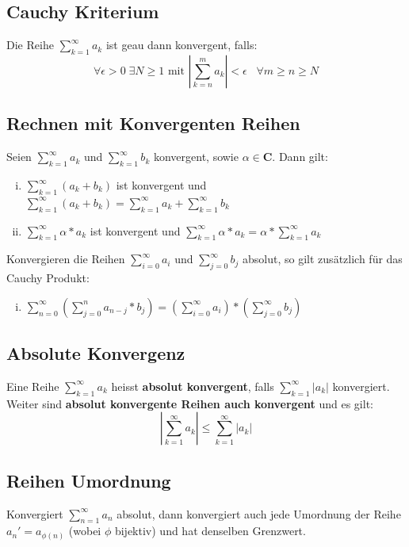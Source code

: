 \documentclass[8pt]{article}
\begin{document}
\begin{multicols*}{3}
\subsection{Cauchy Kriterium}
Die Reihe $\sum_{k = 1}^{\infty} a_k$ ist geau dann konvergent, falls:
$$
  \forall \epsilon > 0 \; \exists N \geq 1 \text{ mit } \left| \sum_{k = n}^m a_k \right| < \epsilon \; \; \; \forall m \geq n \geq N
$$
\subsection{Rechnen mit Konvergenten Reihen}
Seien $\sum_{k = 1}^\infty a_k$ und $\sum_{k = 1}^\infty b_k$ konvergent, sowie $\alpha \in \mathbf{C}$.
Dann gilt:
\begin{enumerate}[(i)]
  \item $\sum_{k = 1}^\infty (a_k + b_k)$ ist konvergent und $\sum_{k = 1}^\infty (a_k + b_k) = \sum_{k = 1}^\infty a_k + \sum_{k = 1}^\infty b_k$
  \item $\sum_{k = 1}^\infty \alpha * a_k$ ist konvergent und $\sum_{k = 1}^\infty \alpha * a_k = \alpha * \sum_{k = 1}^\infty a_k$
\end{enumerate}
Konvergieren die Reihen $\sum_{i = 0}^\infty a_i$ und $\sum_{j = 0}^\infty b_j$ absolut,
so gilt zusätzlich für das Cauchy Produkt:
\begin{enumerate}[(iii)]
  \item $\sum_{n = 0}^\infty (\sum_{j = 0}^n a_{n - j} * b_j) = (\sum_{i = 0}^\infty a_i) * (\sum_{j = 0}^\infty b_j)$
\end{enumerate}
\subsection {Absolute Konvergenz}
Eine Reihe $\sum_{k = 1}^{\infty} a_k$ heisst \textbf{absolut konvergent},
falls $\sum_{k = 1}^{\infty} |a_k|$ konvergiert. Weiter sind \textbf{absolut konvergente Reihen
auch konvergent} und es gilt:
$$
  \left| \sum_{k = 1}^{\infty} a_k \right| \leq \sum_{k = 1}^{\infty} |a_k|
$$

\subsection{Reihen Umordnung}

Konvergiert $\sum_{n = 1}^\infty a_n$ absolut, dann konvergiert auch jede Umordnung
der Reihe $a_n' = a_{\phi(n)}$ (wobei $\phi$ bijektiv) und hat denselben Grenzwert.


\end{multicols*}
\end{document}
